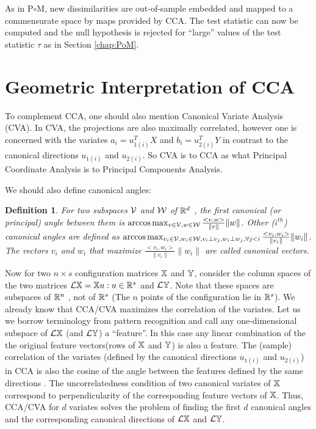 \documentclass[12pt,oneside,final]{thesis}\usepackage[]{graphicx}\usepackage[]{color}
\newtheorem{defn}{Definition}
\begin{document}
As in P$ \circ $M, new dissimilarities are out-of-sample embedded and mapped to a commensurate  space by maps provided by CCA. The test statistic   can now be computed and  the null hypothesis is rejected for ``large'' values of the test statistic $\tau$  as in Section \ref{chap:PoM}.



\section{Geometric Interpretation of CCA}

To complement CCA, one should also mention Canonical Variate Analysis (CVA). In CVA, the  projections are also maximally correlated, however one is concerned with the variates $a_i={u}_{1(i)}^TX $ and $b_i={u}_{2(i)}^T Y $ in contrast to the canonical directions ${u}_{1(i)}$ and ${u}_{2(i)}$. So CVA is to CCA  as what Principal Coordinate Analysis is to Principal Components Analysis.

We should also define canonical angles:

\begin{defn}
For two subspaces $\mathcal{V}$ and $\mathcal{W}$ of $\mathbb{R}^d$ , the first \emph{canonical} (or \emph{principal})  angle  between them  is $\arccos \max_{v \in \mathcal{V}, w \in \mathcal{W}}\frac{<v,w>}{\|v\|}{\|w\|}$. Other ($i^{th}$) canonical angles are defined as 
$\arccos \max_{v_i \in \mathcal{V}, w_i \in \mathcal{W}, v_i \perp v_j, w_i \perp w_j, \forall j<i}\frac{<v_i,w_i>}{\|v_i\|}{\|w_i\|}$.
The vectors $v_i$ and $w_i$ that maximize $\frac{<v_i,w_i>}{\|v_i\|}{\|w_i\|}$ are called \emph{canonical} vectors.
\end{defn}

Now for two $n \times s$ configuration matrices $\mathbb{X}$ and $\mathbb{Y}$, consider the column spaces of the two  matrices  $\mathcal{L}{\mathbb{X}}={\mathbb{X} u : u \in \mathbb{R}^s}$ and ${\mathcal{L}{\mathbb{Y}}}$. Note that these spaces are subspaces of $\mathbb{R}^n$ , not of $\mathbb{R}^s$ (The $n$ points of the configuration lie in $\mathbb{R}^s$). 
We already know that CCA/CVA maximizes the correlation of the variates. Let us we borrow terminology from pattern recognition and call any one-dimensional subspace of   $\mathcal{L}{\mathbb{X}}$ (and $\mathcal{L}{\mathbb{Y}}$) a ``feature''. In this case any linear combination of the  the  original feature vectors(rows of $\mathbb{X}$ and $\mathbb{Y}$) is also a feature. The (sample) correlation of the variates (defined by the canonical directions $u_{1(i)}$ and $u_{2(i)}$) in CCA is also  the cosine of the angle between the features defined by the same directions . The uncorrelatedness condition of two canonical variates of $\mathbb{X}$  correspond to perpendicularity of the corresponding feature vectors of $\mathbb{X}$. Thus,
 CCA/CVA for $d$ variates solves the problem of finding the first $d$ canonical angles and the corresponding canonical directions of $\mathcal{L}{\mathbb{X}}$ and $\mathcal{L}{\mathbb{Y}}$.
 
\end{document}
